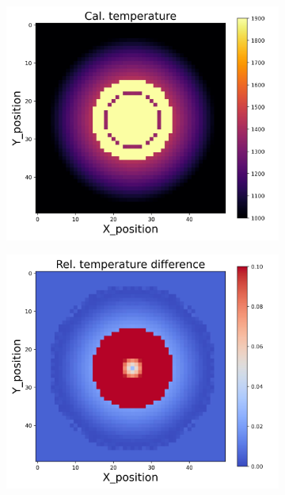 \begin{figure}[htbp]
    \centering
    \begin{minipage}{\textwidth}
        \centering
        \begin{subfigure}{0.325\textwidth}
            \centering
            \includegraphics[width=\textwidth]{figures/raw_data/21/quad/T_cal.jpg}
        \end{subfigure}
        \begin{subfigure}{0.325\textwidth}
            \centering
            \includegraphics[width=\textwidth]{figures/raw_data/21/quad/T_bias.jpg}

\end{subfigure}
\end{minipage}
\end{figure}
